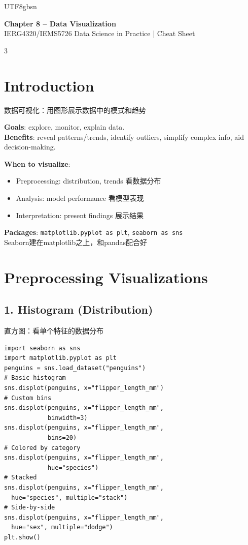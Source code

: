 \documentclass[9pt,landscape,a4paper]{article}
\newcommand{\zhint}[1]{{\scriptsize\color{gray!70!black}#1}}
\begin{document}
\begin{CJK}{UTF8}{gbsn}

\begin{center}
{\large\bfseries\color{blue!70!black} Chapter 8 -- Data Visualization}\\
{\footnotesize IERG4320/IEMS5726 Data Science in Practice | Cheat Sheet}
\end{center}

\begin{multicols}{3}

\section{Introduction}
\zhint{数据可视化：用图形展示数据中的模式和趋势}

\textbf{Goals}: explore, monitor, explain data.\\
\textbf{Benefits}: reveal patterns/trends, identify outliers, simplify complex info, aid decision-making.

\textbf{When to visualize}:
\begin{itemize}[leftmargin=8pt,itemsep=0pt,topsep=0pt]
\item Preprocessing: distribution, trends \zhint{看数据分布}
\item Analysis: model performance \zhint{看模型表现}
\item Interpretation: present findings \zhint{展示结果}
\end{itemize}

\textbf{Packages}: \texttt{matplotlib.pyplot as plt}, \texttt{seaborn as sns}\\
\zhint{Seaborn建在matplotlib之上，和pandas配合好}

\section{Preprocessing Visualizations}

\subsection{1. Histogram (Distribution)}
\zhint{直方图：看单个特征的数据分布}
\begin{lstlisting}
import seaborn as sns
import matplotlib.pyplot as plt
penguins = sns.load_dataset("penguins")
# Basic histogram
sns.displot(penguins, x="flipper_length_mm")
# Custom bins
sns.displot(penguins, x="flipper_length_mm",
            binwidth=3)
sns.displot(penguins, x="flipper_length_mm",
            bins=20)
# Colored by category
sns.displot(penguins, x="flipper_length_mm",
            hue="species")
# Stacked
sns.displot(penguins, x="flipper_length_mm",
  hue="species", multiple="stack")
# Side-by-side
sns.displot(penguins, x="flipper_length_mm",
  hue="sex", multiple="dodge")
plt.show()
\end{lstlisting}


\end{multicols}
\end{CJK}
\end{document}
